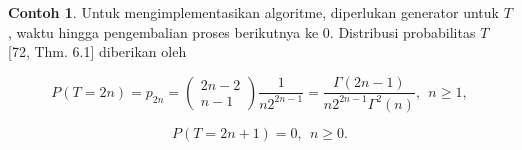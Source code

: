 \documentclass[a4paper,12pt]{article}
\theoremstyle{definition}
\newtheorem{example}{Contoh}[section]
\begin{document}
\begin{example}
Untuk mengimplementasikan algoritme, diperlukan generator untuk $T$, waktu hingga pengembalian proses berikutnya ke 0. Distribusi probabilitas $T$ [72, Thm. 6.1] diberikan oleh

\begin{equation*}
    P(T = 2n) = p_{2n} = \begin{pmatrix} 2n-2\\ n-1 \end{pmatrix} \frac{1}{n2^{2n-1}} = \frac{\Gamma (2n - 1)}{n2^{2n - 1} \Gamma ^2 (n)}, \ \ n \geq 1,
\end{equation*}

\begin{equation*}
    P(T = 2n + 1) = 0, \ \ n \geq 0.
\end{equation*}
\end{example}
\end{document}
